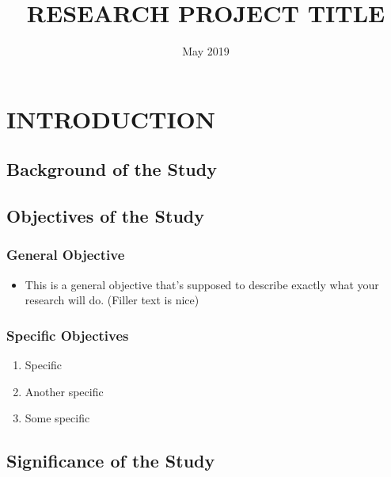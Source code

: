 \documentclass{strrespaper-trad}
\title{RESEARCH PROJECT TITLE} %
\date{May 2019} %
\begin{document}
    \maketitle

    \makeapprovalsheet


    \makeabstract{
        \lipsum[1-2]
    }

    \contents
    \listoflistings

    \mainmatter

    \section{INTRODUCTION}
	    \subsection{Background of the Study}
	        \lipsum[1]

	    \subsection{Objectives of the Study}
	        \subsubsection{General Objective}
	            \begin{itemize}
	                \item This is a general objective that's supposed to describe exactly what your research will do. (Filler text is nice)
	            \end{itemize}
	        \subsubsection{Specific Objectives}
	            \begin{enumerate}
	                \item Specific
	                \item Another specific
	                \item Some specific
	            \end{enumerate}

	    \subsection{Significance of the Study}
	        \lipsum[2]
\end{document}
